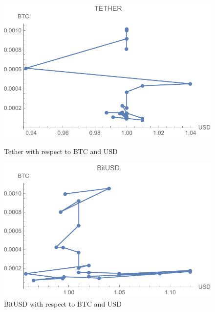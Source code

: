 \begin{figure}[!htb]

	\includegraphics[width=\linewidth]{figures/tether.pdf}
	\caption{Tether with respect to BTC and USD}\label{fig:tether}
	\endminipage\hfill
	\includegraphics[width=\linewidth]{figures/bitusd.pdf}
	\caption{BitUSD with respect to BTC and USD}\label{fig:bitusd}
	\endminipage\hfill
\end{figure}



